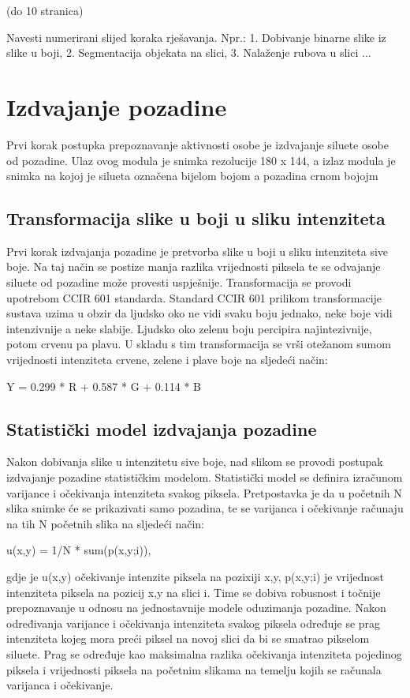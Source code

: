 \documentclass[times, utf8, diplomski]{fer}
\begin{document}
(do 10 stranica)

Navesti numerirani slijed koraka rješavanja. Npr.: 1. Dobivanje binarne slike iz slike u boji, 2. Segmentacija objekata na slici, 3. Nalaženje rubova u slici ...

\section{Izdvajanje pozadine}

Prvi korak postupka prepoznavanje aktivnosti osobe je izdvajanje siluete osobe od pozadine. Ulaz ovog modula je snimka rezolucije 180 x 144, a izlaz modula je snimka na kojoj je silueta označena bijelom bojom a pozadina crnom bojojm

\subsection{Transformacija slike u boji u sliku intenziteta}

Prvi korak izdvajanja pozadine je pretvorba slike u boji u sliku intenziteta sive boje. Na taj način se postize manja razlika vrijednosti piksela te se odvajanje siluete od pozadine može provesti uspješnije. Transformacija se provodi upotrebom CCIR 601 standarda. Standard CCIR 601 prilikom transformacije sustava uzima u obzir da ljudsko oko ne vidi svaku boju jednako, neke boje vidi intenzivnije a neke slabije. Ljudsko oko zelenu boju percipira najintezivnije, potom crvenu pa plavu. U skladu s tim transformacija se vrši otežanom sumom vrijednosti intenziteta crvene, zelene i plave boje na sljedeći način:

Y = 0.299 * R + 0.587 * G + 0.114 * B 

\subsection{Statistički model izdvajanja pozadine}

Nakon dobivanja slike u intenzitetu sive boje, nad slikom se provodi postupak izdvajanje pozadine statističkim modelom. Statistički model se definira izračunom varijance i očekivanja intenziteta svakog piksela. Pretpostavka je da u početnih N slika snimke će se prikazivati samo pozadina, te se varijanca i očekivanje računaju na tih N početnih slika na sljedeći način:

	u(x,y) = 1/N * sum(p(x,y;i)),
	
gdje je u(x,y) očekivanje intenzite piksela na pozixiji x,y, p(x,y;i) je vrijednost intenziteta piksela na pozicij x,y na slici i. Time se dobiva robusnost i točnije prepoznavanje u odnosu na jednostavnije modele oduzimanja pozadine. Nakon određivanja varijance i očekivanja intenziteta svakog piksela određuje se prag intenziteta kojeg mora preći piksel na novoj slici da bi se smatrao pikselom siluete. Prag se određuje kao maksimalna razlika očekivanja intenziteta pojedinog piksela i vrijednosti piksela na početnim slikama na temelju kojih se računala varijanca i očekivanje.
\end{document}
